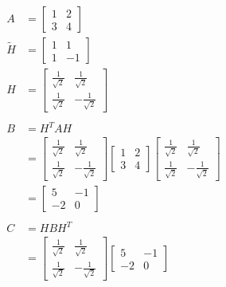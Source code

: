 \begin{figure}[h]
    \centering
    \begin{subfigure}[b]{0.4\textwidth}
        \centering
        \begin {align*}
        A &= \begin{bmatrix}
            1&2\\3&4
        \end{bmatrix}\\
        \tilde{H} &= \begin{bmatrix}
            1&1\\1&-1
        \end{bmatrix}\\
        H &= \begin{bmatrix}
            \frac{1}{\sqrt{2}}&\frac{1}{\sqrt{2}}\\
            \frac{1}{\sqrt{2}}&-\frac{1}{\sqrt{2}}
        \end{bmatrix}\\\\
        B &= H^TAH\\
        &= \begin{bmatrix}
            \frac{1}{\sqrt{2}}&\frac{1}{\sqrt{2}}\\
            \frac{1}{\sqrt{2}}&-\frac{1}{\sqrt{2}}
        \end{bmatrix}\begin{bmatrix}
            1&2\\3&4
        \end{bmatrix}\begin{bmatrix}
            \frac{1}{\sqrt{2}}&\frac{1}{\sqrt{2}}\\
            \frac{1}{\sqrt{2}}&-\frac{1}{\sqrt{2}}
        \end{bmatrix}\\
        &=\begin{bmatrix}
            5&-1\\-2&0
        \end{bmatrix}\\\\
        C &= HBH^T\\
        &= \begin{bmatrix}
            \frac{1}{\sqrt{2}}&\frac{1}{\sqrt{2}}\\
            \frac{1}{\sqrt{2}}&-\frac{1}{\sqrt{2}}
        \end{bmatrix}\begin{bmatrix}
            5&-1\\-2&0

\end{bmatrix}
\end{align*}
\end{subfigure}
\end{figure}
